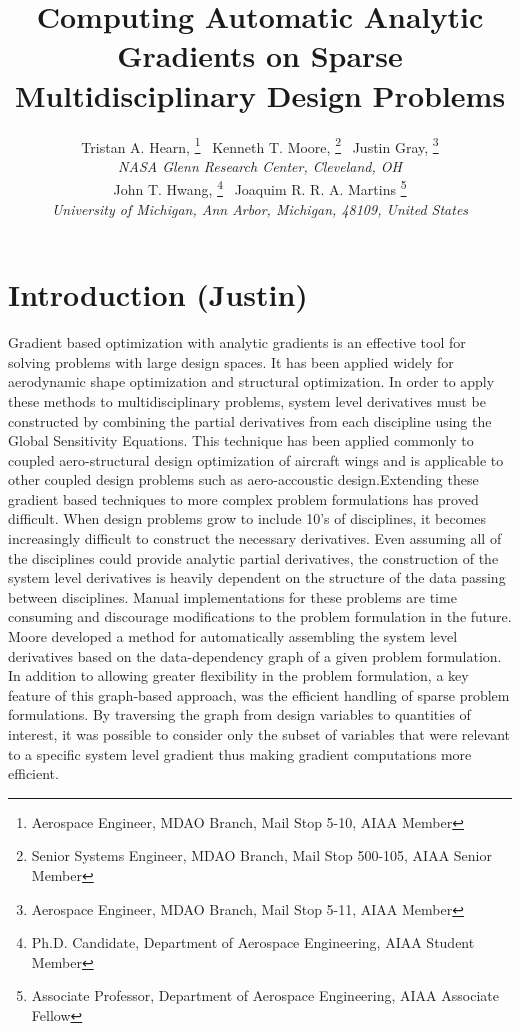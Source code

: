 \documentclass[]{aiaa-tc} %
\title{Computing Automatic Analytic Gradients on Sparse Multidisciplinary Design Problems }
\author{
  Tristan A. Hearn,%
     \thanks{Aerospace Engineer, MDAO Branch, Mail Stop 5-10, AIAA Member}
  \ Kenneth T. Moore,%
     \thanks{Senior Systems Engineer, MDAO Branch, Mail Stop 500-105, AIAA Senior Member}
  \ Justin Gray,%
     \thanks{Aerospace Engineer, MDAO Branch, Mail Stop 5-11, AIAA Member}
   \\
  {\normalsize\itshape
  NASA Glenn Research Center, Cleveland, OH}  \\
  John T. Hwang,%
  \thanks{Ph.D. Candidate, Department of Aerospace Engineering, AIAA Student Member}
  \ Joaquim R. R. A. Martins%
  \thanks{Associate Professor, Department of Aerospace Engineering, AIAA Associate Fellow}
  \\
  {\normalsize\itshape
   University of Michigan, Ann Arbor, Michigan, 48109, United States}
}
\begin{document}
  \maketitle

  \begin{abstract}

  \end{abstract}

  \section{Introduction (Justin)}

    Gradient based optimization with analytic gradients is an effective tool for solving problems 
    with large design spaces. It has been applied widely for aerodynamic shape optimization \cite{Liou2010,palacios2012adjoint}
    and structural optimization\cite{venkataraman2004structural, }. 
    In order to apply these methods to multidisciplinary problems, system level derivatives must be 
    constructed by combining the partial derivatives from each discipline using the Global Sensitivity 
    Equations\cite{Sobieski1990}. This technique has been applied commonly to coupled 
    aero-structural design optimization of aircraft wings\cite{Kenway2012c, Haghighat2012} and is applicable to 
    other coupled design problems such as aero-accoustic design\cite{economon2012coupled}.Extending these 
    gradient based techniques to more complex problem formulations has proved difficult. When 
    design problems grow to include 10's of disciplines, it becomes increasingly difficult to construct the 
    necessary derivatives. Even assuming all of the disciplines could provide analytic partial derivatives, 
    the construction of the system level derivatives is heavily dependent on the structure of the data passing 
    between disciplines. Manual implementations for these problems are time consuming and discourage modifications 
    to the problem formulation in the future. Moore developed a method for automatically assembling the system 
    level derivatives based on the data-dependency graph of a given problem formulation\cite{openmdao_derivatives}. 
    In addition to allowing greater flexibility in the problem formulation, a key feature of this graph-based approach, was the efficient 
    handling of sparse problem formulations. By traversing the graph from design variables to quantities of interest, 
    it was possible to consider only the subset of variables that were relevant to a specific system level gradient thus 
    making gradient computations more efficient. 
\end{document}
